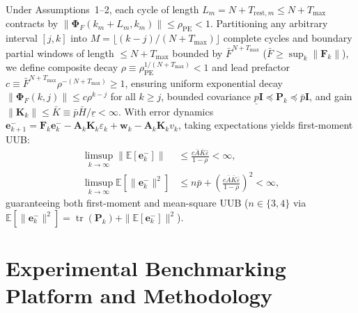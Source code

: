 \documentclass[balance,nocopyright,upint,varvw,hyphenate,barcolor=NavyBlue,nolists]{asmejour}
\begin{document}
Under Assumptions~1--2, each cycle of length $L_m = N + T_{\text{rest},m} \le N + T_{\max}$ contracts by $\|\boldsymbol{\Phi}_F(k_m+L_m, k_m)\| \le \rho_{\text{PE}} < 1$. Partitioning any arbitrary interval $[j, k]$ into $M = \lfloor (k-j)/(N+T_{\max}) \rfloor$ complete cycles and boundary partial windows of length $\le N+T_{\max}$ bounded by $\bar{F}^{N+T_{\max}}$ ($\bar{F} \ge \sup_k \|\mathbf{F}_k\|$), we define composite decay $\rho \equiv \rho_{\text{PE}}^{1/(N+T_{\max})} < 1$ and lead prefactor $c \equiv \bar{F}^{N+T_{\max}} \rho^{-(N+T_{\max})} \ge 1$, ensuring uniform exponential decay $\|\boldsymbol{\Phi}_F(k, j)\| \le c \rho^{k-j}$ for all $k \ge j$, bounded covariance $\underline{p}\mathbf{I} \preceq \mathbf{P}_k \preceq \bar{p}\mathbf{I}$, and gain $\|\mathbf{K}_k\| \le \bar{K} \equiv \bar{p}\bar{H}/\underline{r} < \infty$. With error dynamics $\mathbf{e}_{k+1}^- = \mathbf{F}_k \mathbf{e}_k^- - \mathbf{A}_k \mathbf{K}_k \varepsilon_k + \mathbf{w}_k - \mathbf{A}_k \mathbf{K}_k v_k$, taking expectations yields first-moment UUB:
\begin{align}
\limsup_{k \to \infty} \|\mathbb{E}[\mathbf{e}_k^-]\| &\le \frac{c \bar{A} \bar{K} \bar{\varepsilon}}{1 - \rho} < \infty, \label{eqn:bibs_pidkf}\\
\limsup_{k \to \infty} \mathbb{E}[\|\mathbf{e}_k^-\|^2] &\le n\bar{p} + \left(\frac{c \bar{A} \bar{K} \bar{\varepsilon}}{1 - \rho}\right)^2 < \infty, \label{eqn:ms_pidkf}
\end{align}
guaranteeing both first-moment and mean-square UUB ($n \in \{3, 4\}$ via $\mathbb{E}[\|\mathbf{e}_k^-\|^2] = \operatorname{tr}(\mathbf{P}_k) + \|\mathbb{E}[\mathbf{e}_k^-]\|^2$).
\section{Experimental Benchmarking Platform and Methodology}
\end{document}
